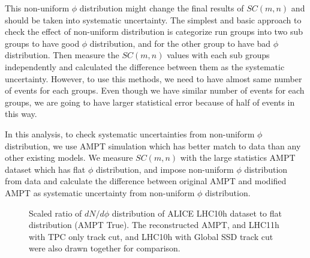 This non-uniform $\phi$ distribution might change the final results of $SC(m,n)$ and should be taken into systematic uncertainty. The simplest and basic approach to check the effect of non-uniform distribution is categorize run groups into two sub groups to have good $\phi$ distribution, and for the other group to have bad $\phi$ distribution. Then measure the $SC(m,n)$ values with each sub groups independently and calculated the difference between them as the systematic uncertainty. However, to use this methods, we need to have almost same number of events for each groups. Even though we have similar number of events for each groups, we are going to have larger statistical error because of half of events in this way. 

  In this analysis, to check systematic uncertainties from non-uniform $\phi$ distribution, we use AMPT simulation which has better match to data than any other existing models. We measure $SC(m,n)$ with the large statistics AMPT dataset which has  flat $\phi$ distribution, and impose non-uniform $\phi$ distribution from data and calculate the difference between original AMPT and modified AMPT as systematic uncertainty from non-uniform $\phi$ distribution. 


 	\begin{figure}[h]
		\begin{center}
        \caption{Scaled ratio of $dN/d\phi$ distribution of ALICE LHC10h dataset to flat distribution (AMPT True). The reconstructed AMPT, and LHC11h with TPC only track cut, and LHC10h with Global SSD track cut were also drawn together for comparison.}
        \label{fig:QC_impose}
        \end{center}   
     \end{figure}
	
